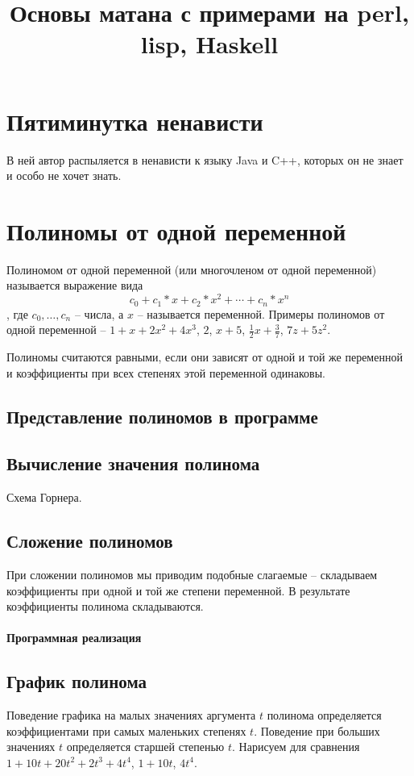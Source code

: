 \documentclass{article}
\begin{document}
\title{Основы матана с примерами на perl, lisp, Haskell}
\maketitle
\section{Пятиминутка ненависти}
В ней автор распыляется в ненависти к языку Java и C++, которых он не знает и особо не хочет знать.
\section{Полиномы от одной переменной}
Полиномом от одной переменной (или многочленом от одной переменной) называется выражение вида
$$c_0+c_1*x+c_2*x^2+\cdots+c_n*x^n$$, где $c_0,\dots, c_n$ -- числа, а $x$ -- называется переменной.
Примеры полиномов от одной переменной -- $1+x+2 x^2+4 x^3$, $2$, $x+5$, $\frac{1}{2}x+\frac{3}{7}$,
$7 z +5 z^2$. 

Полиномы считаются равными, если они зависят от одной и той же переменной и коэффициенты при всех степенях этой переменной одинаковы.
\subsection{Представление полиномов в программе}
\subsection{Вычисление значения полинома}
Схема Горнера.
\subsection{Сложение полиномов}
При сложении полиномов мы приводим подобные слагаемые -- складываем коэффициенты при одной и той же степени переменной. В результате коэффициенты полинома складываются. 
\paragraph{Программная реализация}
\subsection{График полинома}
Поведение графика на малых значениях аргумента $t$ полинома определяется коэффициентами при самых маленьких степенях $t$. Поведение при больших значениях $t$ определяется старшей степенью $t$. Нарисуем для сравнения $1+10t+20t^2+2t^3+4t^4$, $1+10t$, $4t^4$. 
\end{document}
